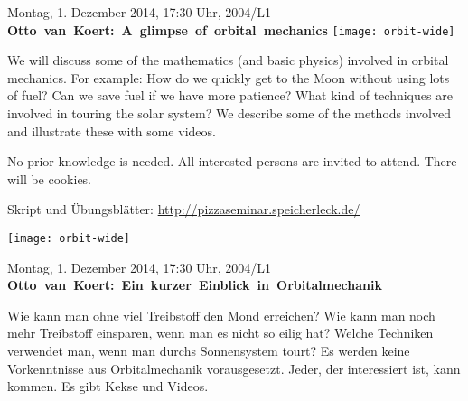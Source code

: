 \documentclass[a4paper,ngerman,landscape]{scrartcl}
\begin{document}
\begin{center}
  \Huge
  \vspace*{0.0em}
  Montag, 1. Dezember 2014, 17:30 Uhr, 2004/L1 \\
  \mbox{\textbf{Otto van Koert: A glimpse of orbital mechanics}}
  \vfill
  \vspace{0.3em}
  \texttt{[image: orbit-wide]}
  \vfill

  \huge
  \begin{minipage}{0.80\textwidth}
    \setlength\parskip{\medskipamount}
    \vspace{0.3em}
    We will discuss some of the mathematics (and basic physics) involved in
    orbital mechanics. For example: How do we quickly get to the Moon
    without using lots of fuel? Can we save fuel if we have more patience? What
    kind of techniques are involved in touring the solar system? We
    describe some of the methods involved and illustrate these with some videos.

    No prior knowledge is needed. All interested persons are invited to attend.
    There will be cookies.

    \vspace{1em}
    \hfill\small Skript und Übungsblätter: \url{http://pizzaseminar.speicherleck.de/}
  \end{minipage}
\end{center}

\begin{center}
  \Huge
  \vspace*{0.0em}
  \texttt{[image: orbit-wide]}
  \vspace{0.5em}

  \scalebox{2.5}{Aufgepasst!}
  \scalebox{2.5}{Am Montag gibt es einen}
  \vspace{1em}

  Montag, 1. Dezember 2014, 17:30 Uhr, 2004/L1 \\
  \mbox{\textbf{Otto van Koert: Ein kurzer Einblick in Orbitalmechanik}}

  \Large
  \begin{minipage}{0.80\textwidth}
    \setlength\parskip{\medskipamount}
    \vspace{0.3em}
    Wie kann man ohne viel Treibstoff den Mond erreichen? Wie kann man noch
    mehr Treibstoff einsparen, wenn man es nicht so eilig hat? Welche Techniken
    verwendet man, wenn man durchs Sonnensystem tourt?
    Es werden keine Vorkenntnisse aus Orbitalmechanik vorausgesetzt. Jeder, der
    interessiert ist, kann kommen. Es gibt Kekse und Videos.
  \end{minipage}
\end{center}
\end{document}

